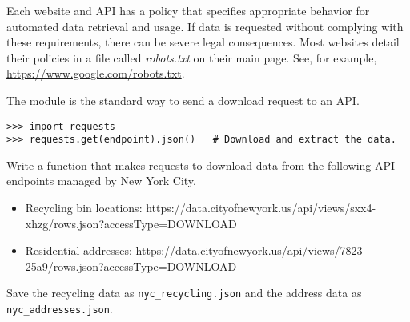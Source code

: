 
\begin{warn}
Each website and API has a policy that specifies appropriate behavior for automated data retrieval and usage.
If data is requested without complying with these requirements, there can be severe legal consequences.
Most websites detail their policies in a file called \emph{robots.txt} on their main page.
See, for example, \url{https://www.google.com/robots.txt}.
\end{warn}


\begin{problem} %
The  module is the standard way to send a download request to an API.
\begin{lstlisting}
>>> import requests
>>> requests.get(endpoint).json()   # Download and extract the data.
\end{lstlisting}

Write a function that makes requests to download data from the following API endpoints managed by New York City.
{\scriptsize
\begin{itemize}
\item Recycling bin locations: https://data.cityofnewyork.us/api/views/sxx4-xhzg/rows.json?accessType=DOWNLOAD
\item Residential addresses: https://data.cityofnewyork.us/api/views/7823-25a9/rows.json?accessType=DOWNLOAD
\end{itemize}}
\noindent Save the recycling data as \texttt{nyc\_recycling.json} and the address data as \texttt{nyc\_addresses.json}.
\label{prob:wt-download-nyc-data}
\end{problem}

